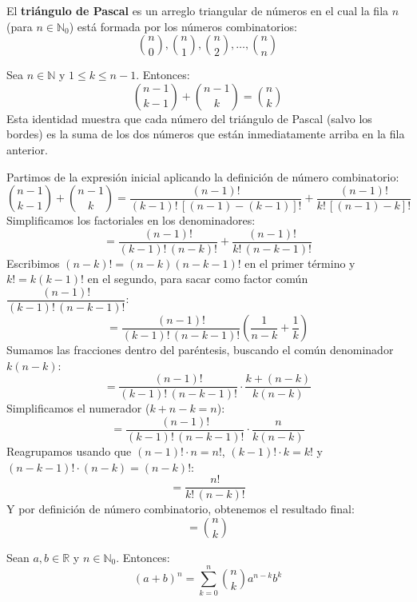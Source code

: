 \begin{definicion}[title=Triángulo de Pascal]
    El \textbf{triángulo de Pascal} es un arreglo triangular de números en el cual la fila $n$ (para $n \in \mathbb{N}_0$) está formada por los números combinatorios:
    \[
    \binom{n}{0}, \binom{n}{1}, \binom{n}{2}, \dots, \binom{n}{n}
    \]
\end{definicion}

\begin{teoria}[title= Identidad de Stifel]
    Sea $n \in \mathbb{N}$ y $1 \leq k \leq n-1$. Entonces:
    \[
    \binom{n-1}{k-1} + \binom{n-1}{k} = \binom{n}{k}
    \]
    Esta identidad muestra que cada número del triángulo de Pascal (salvo los bordes) es la suma de los dos números que están inmediatamente arriba en la fila anterior.
\end{teoria}

\begin{demostracion}
    Partimos de la expresión inicial aplicando la definición de número combinatorio:
    \[
    \binom{n-1}{k-1} + \binom{n-1}{k} = \frac{(n-1)!}{(k-1)!\,[(n-1)-(k-1)]!} + \frac{(n-1)!}{k!\,[(n-1)-k]!}
    \]
    Simplificamos los factoriales en los denominadores:
    \[
    = \frac{(n-1)!}{(k-1)!\,(n-k)!} + \frac{(n-1)!}{k!\,(n-k-1)!}
    \]
    Escribimos $(n-k)! = (n-k)(n-k-1)!$ en el primer término y $k! = k(k-1)!$ en el segundo, para sacar como factor común $\dfrac{(n-1)!}{(k-1)!\,(n-k-1)!}$:
    \[
    = \frac{(n-1)!}{(k-1)!\,(n-k-1)!}\left(\frac{1}{n-k} + \frac{1}{k}\right)
    \]
    Sumamos las fracciones dentro del paréntesis, buscando el común denominador $k(n-k)$:
    \[
    = \frac{(n-1)!}{(k-1)!\,(n-k-1)!} \cdot \frac{k+(n-k)}{k(n-k)}
    \]
    Simplificamos el numerador ($k + n - k = n$):
    \[
    = \frac{(n-1)!}{(k-1)!\,(n-k-1)!} \cdot \frac{n}{k(n-k)}
    \]
    Reagrupamos usando que $(n-1)!\cdot n = n!$, $(k-1)!\cdot k = k!$ y $(n-k-1)!\cdot(n-k) = (n-k)!$:
    \[
    = \frac{n!}{k!\,(n-k)!}
    \]
    Y por definición de número combinatorio, obtenemos el resultado final:
    \[
    = \binom{n}{k}
    \]
\end{demostracion}


\begin{proposicion}[title= Teorema del Binomio]
    Sean $a, b \in \mathbb{R}$ y $n \in \mathbb{N}_0$. Entonces:
    \[
    (a+b)^n = \sum_{k=0}^{n} \binom{n}{k} a^{n-k} b^k
    \]
\end{proposicion}

